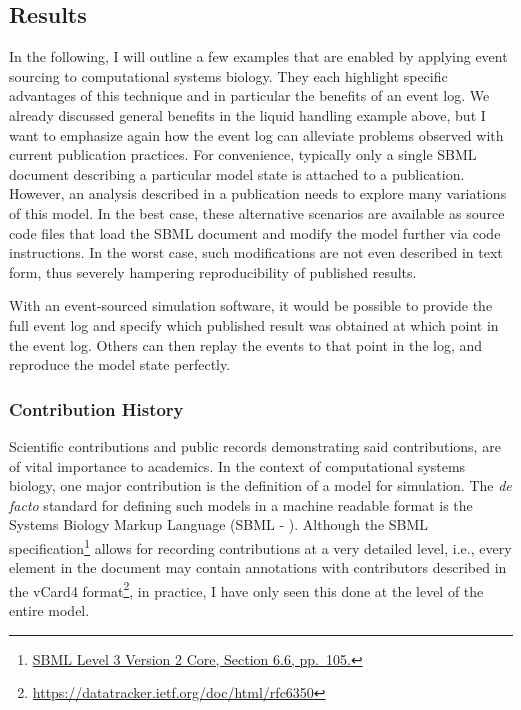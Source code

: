 \documentclass[
  a4paper,
]{scrartcl}
\begin{document}
\subsection{Results}\label{results}

In the following, I will outline a few examples that are enabled by
applying event sourcing to computational systems biology. They each
highlight specific advantages of this technique and in particular the
benefits of an event log. We already discussed general benefits in the
liquid handling example above, but I want to emphasize again how the
event log can alleviate problems observed with current publication
practices. For convenience, typically only a single SBML document
describing a particular model state is attached to a publication.
However, an analysis described in a publication needs to explore many
variations of this model. In the best case, these alternative scenarios
are available as source code files that load the SBML document and
modify the model further via code instructions. In the worst case, such
modifications are not even described in text form, thus severely
hampering reproducibility of published results.

With an event-sourced simulation software, it would be possible to
provide the full event log and specify which published result was
obtained at which point in the event log. Others can then replay the
events to that point in the log, and reproduce the model state
perfectly.

\subsubsection{Contribution History}\label{contribution-history}

Scientific contributions and public records demonstrating said
contributions, are of vital importance to academics. In the context of
computational systems biology, one major contribution is the definition
of a model for simulation. The \emph{de facto} standard for defining
such models in a machine readable format is the Systems Biology Markup
Language (SBML - ).
Although the SBML specification\footnote{\href{https://identifiers.org/combine.specifications:sbml.level-3.version-2.core.release-2}{SBML
  Level 3 Version 2 Core, Section 6.6, pp.~105.}} allows for recording
contributions at a very detailed level, i.e., every element in the
document may contain annotations with contributors described in the
vCard4 format\footnote{\url{https://datatracker.ietf.org/doc/html/rfc6350}},
in practice, I have only seen this done at the level of the entire
model.
\end{document}
